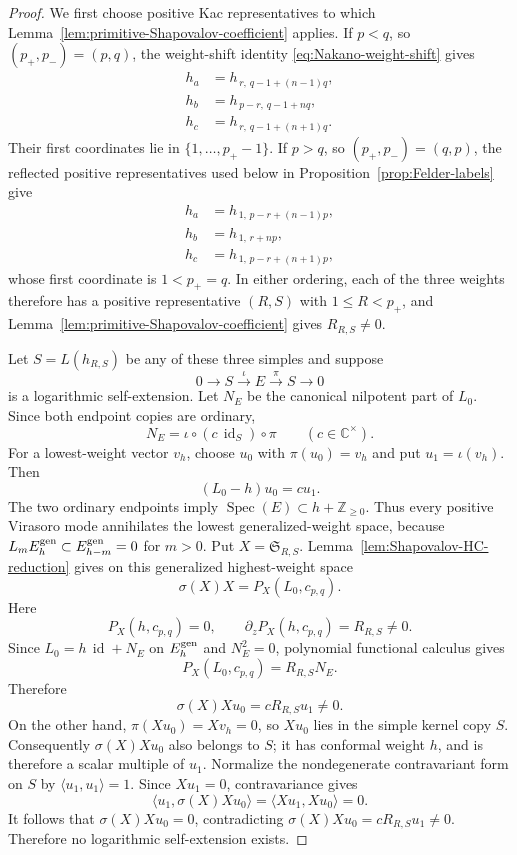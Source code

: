 \documentclass[12pt,leqno]{amsart}
\numberwithin{equation}{section}
\newcommand{\id}{\operatorname{id}}
\def\Z{\mathbb{Z}}
\def\C{\mathbb{C}}
\begin{document}
\begin{proof}
We first choose positive Kac representatives to which
Lemma~\ref{lem:primitive-Shapovalov-coefficient} applies.  If $p<q$, so
$(p_+,p_-)=(p,q)$, the weight-shift identity
\eqref{eq:Nakano-weight-shift} gives
\[
 \begin{aligned}
 h_a&=h_{\,r,\,q-1+(n-1)q},\\
 h_b&=h_{\,p-r,\,q-1+nq},\\
 h_c&=h_{\,r,\,q-1+(n+1)q}.
 \end{aligned}
\]
Their first coordinates lie in $\{1,\ldots,p_+-1\}$.  If $p>q$, so
$(p_+,p_-)=(q,p)$, the reflected positive representatives used below in
Proposition~\ref{prop:Felder-labels} give
\[
 \begin{aligned}
 h_a&=h_{\,1,\,p-r+(n-1)p},\\
 h_b&=h_{\,1,\,r+np},\\
 h_c&=h_{\,1,\,p-r+(n+1)p},
 \end{aligned}
\]
whose first coordinate is $1<p_+=q$.  In either ordering, each of the
three weights therefore has a positive representative $(R,S)$ with
$1\le R<p_+$, and Lemma~\ref{lem:primitive-Shapovalov-coefficient}
gives $R_{R,S}\ne0$.

Let $S=L(h_{R,S})$ be any of these three simples and suppose
\[
 0\longrightarrow S\xrightarrow{\iota}E\xrightarrow{\pi}S
 \longrightarrow0
\]
is a logarithmic self-extension.  Let $N_E$ be the canonical nilpotent
part of $L_0$.  Since both endpoint copies are ordinary,
\[
 N_E=\iota\circ(c\,\id_S)\circ\pi
 \qquad(c\in\C^\times).
\]
For a lowest-weight vector $v_h$, choose $u_0$ with $\pi(u_0)=v_h$ and
put $u_1=\iota(v_h)$.  Then
\[
 (L_0-h)u_0=cu_1.
\]
The two ordinary endpoints imply
$\operatorname{Spec}(E)\subset h+\Z_{\ge0}$.  Thus every positive
Virasoro mode annihilates the lowest generalized-weight space, because
$L_mE_h^{\rm gen}\subset E_{h-m}^{\rm gen}=0$ for $m>0$.  Put
$X=\mathfrak S_{R,S}$.  Lemma~\ref{lem:Shapovalov-HC-reduction} gives
on this generalized highest-weight space
\[
 \sigma(X)X=P_X(L_0,c_{p,q}).
\]
Here
\[
 P_X(h,c_{p,q})=0,\qquad
 \partial_zP_X(h,c_{p,q})=R_{R,S}\ne0.
\]
Since $L_0=h\,\id+N_E$ on $E_h^{\rm gen}$ and $N_E^2=0$, polynomial
functional calculus gives
\[
 P_X(L_0,c_{p,q})
 =R_{R,S}N_E.
\]
Therefore
\[
 \sigma(X)Xu_0=cR_{R,S}u_1\ne0.
\]
On the other hand,
$\pi(Xu_0)=Xv_h=0$, so $Xu_0$ lies in the simple kernel copy $S$.
Consequently $\sigma(X)Xu_0$ also belongs to $S$; it has conformal
weight $h$, and is therefore a scalar multiple of $u_1$.  Normalize the
nondegenerate contravariant form on $S$ by
$\langle u_1,u_1\rangle=1$.  Since $Xu_1=0$, contravariance gives
\[
 \big\langle u_1,\sigma(X)Xu_0\big\rangle
 =\big\langle Xu_1,Xu_0\big\rangle=0.
\]
It follows that $\sigma(X)Xu_0=0$, contradicting
$\sigma(X)Xu_0=cR_{R,S}u_1\ne0$.  Therefore no logarithmic
self-extension exists.


\end{proof}
\end{document}
